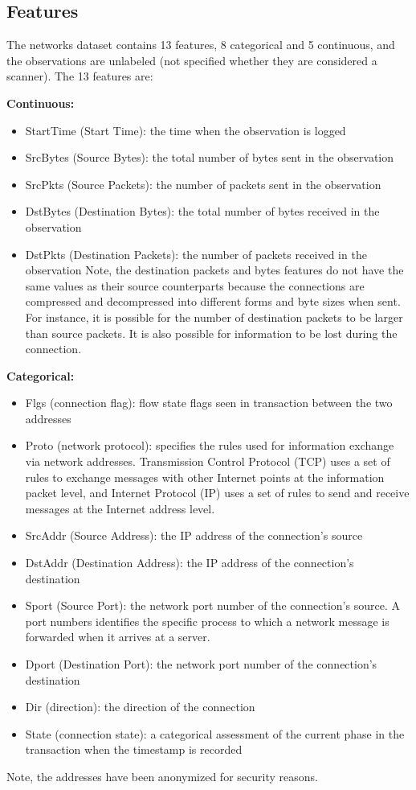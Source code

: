 \documentclass[12pt,twoside]{dukestatscithesis}
\providecommand{\tightlist}{%
  \setlength{\itemsep}{0pt}\setlength{\parskip}{0pt}}
\theoremstyle{definition}
\theoremstyle{definition}
\theoremstyle{definition}
\theoremstyle{remark}
\begin{document}
\subsection{Features}\label{features}

The networks dataset contains 13 features, 8 categorical and 5
continuous, and the observations are unlabeled (not specified whether
they are considered a scanner). The 13 features are:

\textbf{Continuous:}
\begin{itemize}
\tightlist
\item
  StartTime (Start Time): the time when the observation is logged
\item
  SrcBytes (Source Bytes): the total number of bytes sent in the
  observation
\item
  SrcPkts (Source Packets): the number of packets sent in the
  observation
\item
  DstBytes (Destination Bytes): the total number of bytes received in
  the observation
\item
  DstPkts (Destination Packets): the number of packets received in the
  observation Note, the destination packets and bytes features do not
  have the same values as their source counterparts because the
  connections are compressed and decompressed into different forms and
  byte sizes when sent. For instance, it is possible for the number of
  destination packets to be larger than source packets. It is also
  possible for information to be lost during the connection.
\end{itemize}
\textbf{Categorical:}
\begin{itemize}
\tightlist
\item
  Flgs (connection flag): flow state flags seen in transaction between
  the two addresses
\item
  Proto (network protocol): specifies the rules used for information
  exchange via network addresses. Transmission Control Protocol (TCP)
  uses a set of rules to exchange messages with other Internet points at
  the information packet level, and Internet Protocol (IP) uses a set of
  rules to send and receive messages at the Internet address level.
\item
  SrcAddr (Source Address): the IP address of the connection's source
\item
  DstAddr (Destination Address): the IP address of the connection's
  destination
\item
  Sport (Source Port): the network port number of the connection's
  source. A port numbers identifies the specific process to which a
  network message is forwarded when it arrives at a server.
\item
  Dport (Destination Port): the network port number of the connection's
  destination
\item
  Dir (direction): the direction of the connection
\item
  State (connection state): a categorical assessment of the current
  phase in the transaction when the timestamp is recorded
\end{itemize}
Note, the addresses have been anonymized for security reasons.
\end{document}
